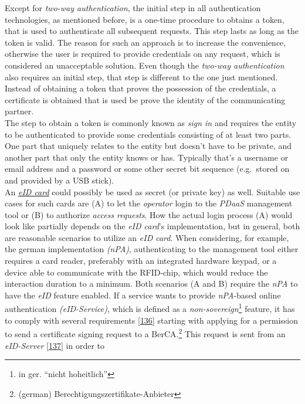 \documentclass[12pt,english,a4paper,titlepage,cleardoublepage=empty,dottedtoc]{report}
\begin{document}
Except for \emph{two-way authentication}, the initial step in all
authentication technologies, as mentioned before, is a one-time
procedure to obtains a token, that is used to authenticate all
subsequent requests. This step lasts as long as the token is valid. The
reason for such an approach is to increase the convenience, otherwise
the user is required to provide credentials on any request, which is
considered an unacceptable solution. Even though the \emph{two-way
authentication} also requires an initial step, that step is different to
the one just mentioned. Instead of obtaining a token that proves the
possession of the credentials, a certificate is obtained that is used be
prove the identity of the communicating partner.\\
The step to obtain a token is commonly known as \emph{sign in} and
requires the entity to be authenticated to provide some credentials
consisting of at least two parts. One part that uniquely relates to the
entity but doesn't have to be private, and another part that only the
entity knows or has. Typically that's a username or email address and a
password or some other secret bit sequence (e.g.~stored on and provided
by a USB stick).\\
An \emph{\protect\hyperlink{def--eid-card}{eID card}} could possibly be
used as secret (or private key) as well. Suitable use cases for such
cards are (A) to let the \emph{operator} login to the \emph{PDaaS}
management tool or (B) to authorize \emph{access requests}. How the
actual login process (A) would look like partially depends on the
\emph{eID card}'s implementation, but in general, both are reasonable
scenarios to utilize an \emph{eID card}. When considering, for example,
the german implementation \emph{(nPA)}, authenticating to the management
tool either requires a card reader, preferably with an integrated
hardware keypad, or a device able to communicate with the RFID-chip,
which would reduce the interaction duration to a minimum. Both scenarios
(A and B) require the \emph{nPA} to have the \emph{eID} feature enabled.
If a service wants to provide \emph{nPA}-based online authentication
\emph{(eID-Service)}, which is defined as a
\emph{non-sovereign}\footnote{in ger. ``nicht hoheitlich''} feature, it
has to comply with several requirements
{[}\protect\hyperlink{ref-web_bsi-spec_eid}{136}{]} starting with
applying for a permission to send a certificate signing request to a
BerCA.\footnote{(german) Berechtigungszertifikate-Anbieter} This request
is sent from an \emph{eID-Server}
{[}\protect\hyperlink{ref-web_2017_npa-eid-server}{137}{]} in order to
\end{document}

